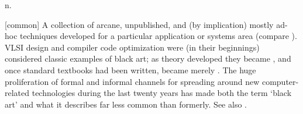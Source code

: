  n.

[common] A collection of arcane, unpublished, and (by implication) mostly ad-hoc
techniques developed for a particular application or systems area (compare
). VLSI design and compiler code optimization were (in
their beginnings) considered classic examples of black art; as theory developed
they became , and once standard textbooks had been
written, became merely . The huge proliferation of
formal and informal channels for spreading around new computer-related
technologies during the last twenty years has made both the term `black art' and
what it describes far less common than formerly. See also .

